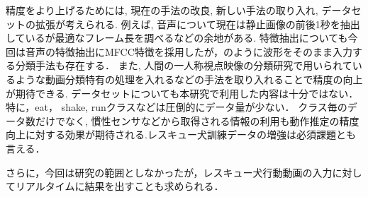 \documentclass[twocolumn, a4paper]{UECIEresume}
\begin{document}
精度をより上げるためには, 現在の手法の改良, 新しい手法の取り入れ, データセットの拡張が考えられる.
例えば, 音声について現在は静止画像の前後1秒を抽出しているが最適なフレーム長を調べるなどの余地がある.
特徴抽出についても今回は音声の特徴抽出にMFCC特徴を採用したが，\cite{aytar2016soundnet}のように波形をそのまま入力する分類手法も存在する．
また, 人間の一人称視点映像の分類研究\cite{minghuang2016fpar}で用いられているような動画分類特有の処理を入れるなどの手法を取り入れることで精度の向上が期待できる.
データセットについても本研究で利用した内容は十分ではない．特に，eat， shake, runクラスなどは圧倒的にデータ量が少ない．
クラス毎のデータ数だけでなく, 慣性センサなどから取得される情報の利用も動作推定の精度向上に対する効果が期待される.レスキュー犬訓練データの増強は必須課題とも言える．

さらに，今回は研究の範囲としなかったが，レスキュー犬行動動画の入力に対してリアルタイムに結果を出すことも求められる．

{\scriptsize %
%


}
% 
% 
\end{document}
